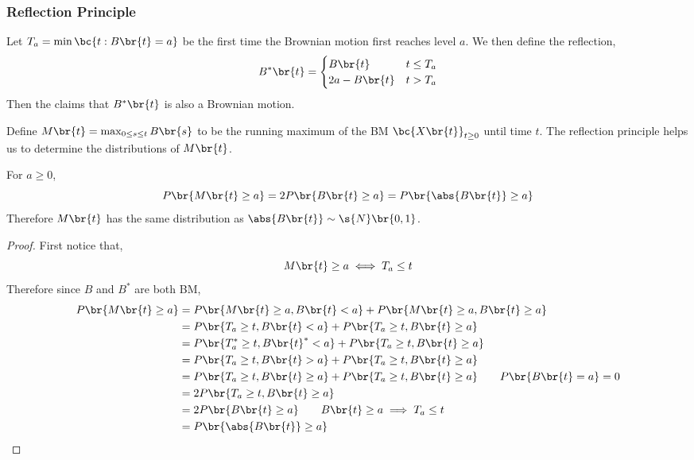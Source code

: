 \documentclass{article}
\begin{document}
    \subsubsection{Reflection Principle}
    Let $T_a = \min\bc{t: B\br{t} = a}$ be the first time the Brownian motion first reaches level $a$. We then define the reflection,
    \begin{align*}
        B^*\br{t} = \begin{cases}
            B\br{t} & t \leq T_a \\
            2a - B\br{t} & t > T_a \\
        \end{cases}
    \end{align*}
    Then the  claims that $B^{*}\br{t}$ is also a Brownian motion.
    \begin{definition}
        Define $M\br{t} = \max_{0 \leq s \leq t} B\br{s}$ to be the running maximum of the BM $\bc{X\br{t}}_{t \geq 0}$ until time $t$. The reflection principle helps us to determine the distributions of $M\br{t}$.
    \end{definition}
    \begin{theorem}
        For $a \geq 0$,
        \[ P\br{M\br{t} \geq a} = 2 P\br{B\br{t} \geq a} = P\br{\abs{B\br{t}} \geq a} \]
        Therefore $M\br{t}$ has the same distribution as $\abs{B\br{t}} \sim \s{N}\br{0,1}$.
    \end{theorem}
    \begin{proof}
        First notice that,
        \[ M\br{t} \geq a \iff T_{a} \leq t \]
        Therefore since $B$ and $B^{*}$ are both BM,
        \begin{align*}
            P\br{M\br{t} \geq a}
            &= P\br{M\br{t} \geq a, B\br{t} < a} + P\br{M\br{t} \geq a, B\br{t} \geq a} \\
            &= P\br{T_a \geq t, B\br{t} < a} + P\br{T_a \geq t, B\br{t} \geq a} \\
            &= P\br{T_a^* \geq t, B\br{t}^* < a} + P\br{T_a \geq t, B\br{t} \geq a} \\
            &= P\br{T_a \geq t, B\br{t} > a} + P\br{T_a \geq t, B\br{t} \geq a} \\
            &= P\br{T_a \geq t, B\br{t} \geq a} + P\br{T_a \geq t, B\br{t} \geq a} \qquad P\br{B\br{t} = a} = 0\\
            &= 2P\br{T_a \geq t, B\br{t} \geq a}\\
            &= 2P\br{B\br{t} \geq a} \qquad B\br{t} \geq a \implies T_a \leq t\\
            &= P\br{\abs{B\br{t}} \geq a}
        \end{align*}
    \end{proof}
\end{document}
